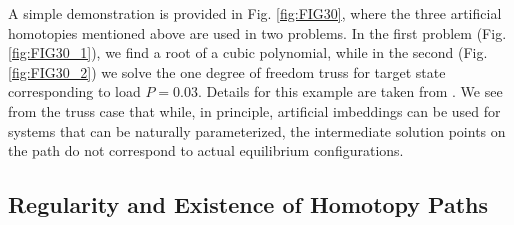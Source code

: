 \begin{figure*}[h]
	\centering
	\qquad
	\caption{Homotopy paths for \textbf{(a)} $f(x)=x^3-6x^2+21x-26=0$, with 
		starting point
		$x_0=0$ and convergence at root $x_1=2$ when $t=1$ and 
		\textbf{(b)}
		truss, with initial state the undeformed
		configuration($x_0=0$) and target load level $P=0.03$.}%
	\label{fig:FIG30}%
\end{figure*}
\clearpage
A simple demonstration is provided in Fig. \ref{fig:FIG30}, where the
three artificial homotopies
mentioned above are used in two problems. In the first problem
(Fig. \ref{fig:FIG30_1}), we find a root 
of a cubic polynomial, while in the second (Fig. \ref{fig:FIG30_2}) 
we solve the 
one degree of freedom truss for target state corresponding to load $P=0.03$. 
Details for this example are taken from \cite{Rheinboldt:1981}. We see
from the truss case that while, in principle, artificial imbeddings can be 
used for systems that can be naturally parameterized, the intermediate solution
points on the path do not correspond to actual equilibrium configurations. 

\subsection{Regularity and Existence of Homotopy Paths}\label{CH4-S1SS2}

